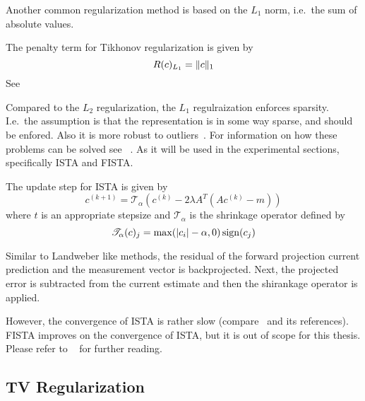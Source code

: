 Another common regularization method is based on the \(L_1\) norm, i.e.\ the sum of absolute
values.
\begin{definition}[\(L_1\)-Regularization]\label{def:l1_regularization}
	The penalty term for Tikhonov regularization is given by
	\[
		R(c)_{L_1} = \lVert c\rVert_1
	\]
	See~\cite{tibshirani_regression_1996,tibshirani_lasso_2013,beck_fast_2009}
\end{definition}
Compared to the \(L_2\) regularization, the \(L_1\) regulraization enforces sparsity. I.e.\ the
assumption is that the representation is in some way sparse, and should be enfored. Also it is
more robust to outliers~\cite{beck_fast_2009}. For information on how these problems can be solved
see \citeauthor{beck_fast_2009}~\cite{beck_fast_2009}. As it will be used in the experimental
sections, specifically \gls{ISTA} and  \gls{FISTA}.

\begin{definition}[ISTA]\label{def:ista}
	The update step for \gls{ISTA} is given by
	\[
		c^{(k+1)} = \mathscr{T_\alpha} (c^{(k)} - 2 \lambda A^T (A c^{(k)} - m))
	\]
	where \(t\) is an appropriate stepsize and \(\mathscr{T_\alpha}\) is the shrinkage operator
	defined by
	\[
		\mathscr{T_\alpha}(c)_j = \max(\lvert c_i\rvert - \alpha, 0) \operatorname{sign}(c_j)
	\]
\end{definition}
Similar to Landweber like methods, the residual of the forward projection current prediction and the
measurement vector is backprojected. Next, the projected error is subtracted from the current
estimate and then the shirankage operator is applied.

However, the convergence of \gls{ISTA} is rather slow (compare~\cite{beck_fast_2009} and its
references). \gls{FISTA} improves on the convergence of \gls{ISTA}, but it is out of scope for this
thesis. Please refer to \citeauthor{beck_fast_2009}~\cite{beck_fast_2009} for further reading.

\subsection{TV Regularization}\label{subsec:tv_regularization}

%
